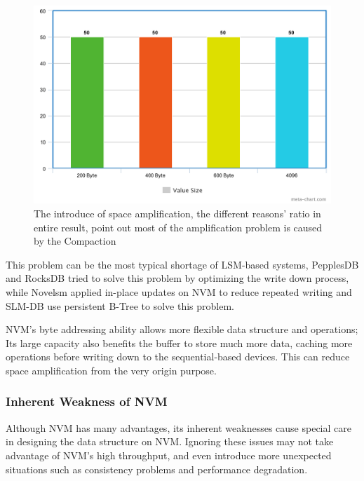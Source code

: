 \begin{figure}
	\centering
	\includegraphics[width=0.7\columnwidth]{fig/meta2}
	\caption{The introduce of space amplification, the different reasons' ratio in entire result, point out most of the amplification problem is caused by the Compaction}
	\label{fig:space_amplification}
\end{figure}

This problem can be the most typical shortage of LSM-based systems, PepplesDB\cite{raju2017pebblesdb} and RocksDB\cite{dong2017optimizing} tried to solve this problem by optimizing the write down process, while Novelsm\cite{kannan2018redesigning} applied in-place updates on NVM to reduce repeated writing and SLM-DB use persistent B-Tree to solve this problem.

NVM's byte addressing ability allows more flexible data structure and operations; Its large capacity also benefits the buffer to store much more data, caching more operations before writing down to the sequential-based devices. This can reduce space amplification from the very origin purpose.


%

\subsubsection{Inherent Weakness of NVM}
Although NVM has many advantages, its inherent weaknesses cause special care in designing the data structure on NVM. Ignoring these issues may not take advantage of NVM's high throughput, and even introduce more unexpected situations such as consistency problems and performance degradation.

